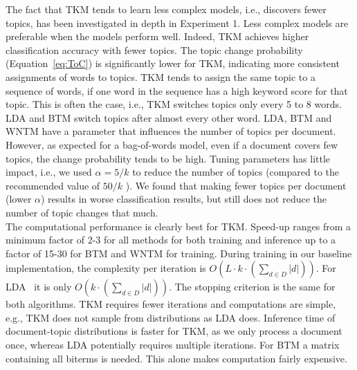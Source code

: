 \documentclass[twocolumn,10]{article}
\newcommand{\ci}{~\cite} \newcommand{\re}{~\ref} \newcommand{\ma}{\mathbb}
\begin{document}
	The fact that TKM tends to learn less complex models, i.e., discovers fewer topics, has been investigated in depth in Experiment 1. Less complex models are preferable when the models perform well. Indeed, TKM achieves higher classification accuracy with fewer topics. The topic change probability (Equation\re{eq:ToC}) is significantly lower for TKM, indicating more consistent assignments of words to topics. TKM tends to assign the same topic to a sequence of words, if one word in the sequence has a high keyword score for that topic. This is often the case, i.e., TKM switches topics only every 5 to 8 words. LDA and BTM switch topics after almost every other word. LDA, BTM and WNTM have a parameter that influences the number of topics per document. However, as expected for a bag-of-words model, even if a document covers few topics, the change probability tends to be high. Tuning parameters has little impact, i.e., we used $\alpha=5/k$ to reduce the number of topics (compared to the recommended value of $50/k$ \cite{gri04b}). We found that making fewer topics per document (lower $\alpha$) results in worse classification results, but still does not reduce the number of topic changes that much.\\
	The computational performance is clearly best for TKM. Speed-up ranges from a minimum factor of 2-3 for all methods for both training and inference up to a factor of 15-30 for BTM and WNTM for training. During training in our baseline implementation, the complexity per iteration is $O(L\cdot k \cdot (\sum_{d \in D} |d|))$. For LDA\ci{gri04b} it is only $O(k \cdot (\sum_{d \in D} |d|))$. The stopping criterion is the same for both algorithms. TKM requires fewer iterations and computations are simple, e.g., TKM does not sample from distributions as LDA does. Inference time of document-topic distributions is faster for TKM, as we only process a document once, whereas LDA potentially requires multiple iterations. For BTM a matrix containing all biterms is needed. This alone makes computation fairly expensive. 
	
\end{document}

